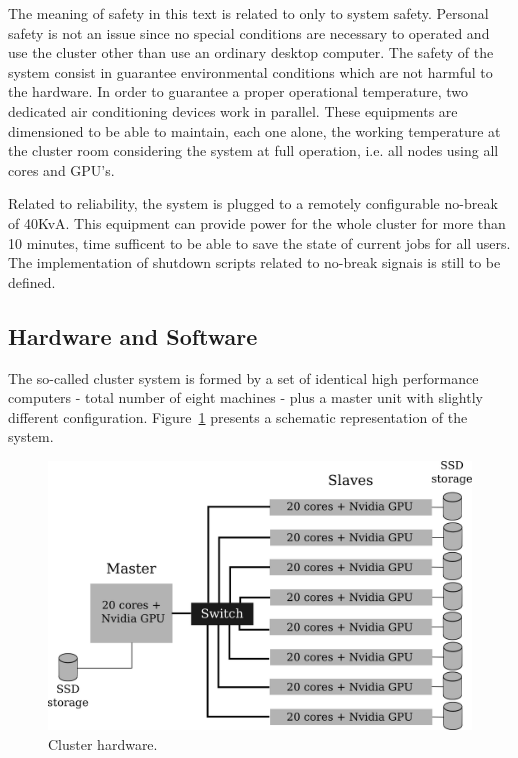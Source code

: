 \documentclass[twoside,a4paper,12pt,english]{inac17}
\begin{document}
The meaning of safety in this text is related to only to system safety. Personal
safety is not an issue since no special conditions are necessary to operated and use the cluster other
than use an ordinary desktop computer. The safety of the system consist in guarantee environmental conditions
which are not harmful to the hardware. In order to guarantee a proper operational temperature, two dedicated
air conditioning devices work in parallel. These equipments are dimensioned to be able to maintain, each one alone,
the working temperature at the cluster room considering the system at full operation, i.e. all nodes using all cores
and GPU's.

Related to reliability, the system is plugged to a remotely configurable no-break of 40KvA. This equipment
can provide power for the whole cluster for more than 10 minutes, time sufficent to be able to save the state of current jobs
for all users. The implementation of shutdown scripts related to no-break signais is still to be defined.

\subsection{Hardware and Software}

The so-called cluster system is formed by a set of identical high performance computers -
total number of eight machines - plus a master unit with slightly different configuration.
Figure~\ref{fig:cluster} presents a schematic representation of the system.

\begin{figure}[h] %
  \centering\includegraphics[scale=0.7]{images/cluster-topologico.png}
  \caption{Cluster hardware.}
  \label{fig:cluster}
\end{figure}
\end{document}

